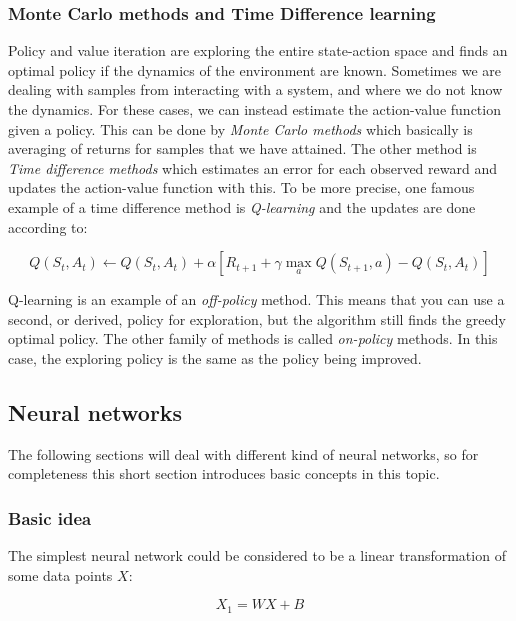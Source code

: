 \subsubsection{Monte Carlo methods and Time Difference learning}

Policy and value iteration are exploring the entire state-action space and
finds an optimal policy if the dynamics of the environment are known. Sometimes
we are dealing with samples from interacting with a system, and where we do not
know the dynamics. For these cases, we can instead estimate the action-value
function given a policy. This can be done by \textit{Monte Carlo methods} which
basically is averaging of returns for samples that we have attained. The other
method is \textit{Time difference methods} which estimates an error for each
observed reward and updates the action-value function with this. To be more
precise, one famous example of a time difference method is \textit{Q-learning}
and the updates are done according to:

\begin{equation}
    Q(S_t, A_t) \leftarrow Q(S_t, A_t) + \alpha \left[ R_{t+1} + \gamma \max_a Q(S_{t+1}, a) - Q(S_t, A_t) \right]
\end{equation}

Q-learning is an example of an \textit{off-policy} method. This means that you
can use a second, or derived, policy for exploration, but the algorithm still
finds the greedy optimal policy. The other family of methods is called
\textit{on-policy} methods. In this case, the exploring policy is the
same as the policy being improved.

\subsection{Neural networks}

The following sections will deal with different kind of neural networks, so
for completeness this short section introduces basic concepts in this topic.

\subsubsection{Basic idea}

The simplest neural network could be considered to be a linear transformation
of some data points $X$:

\begin{equation}
    X_1 = WX + B
\end{equation}

